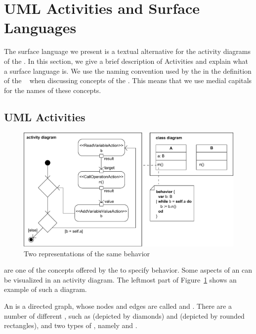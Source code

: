 \section{UML Activities and Surface Languages}
\label{sec:grammars-and-metamodels:Preliminaries}

The surface language we present is a textual alternative for the activity diagrams of the \UML.
In this section, we give a brief description of Activities and explain what a surface language is.
We use the naming convention used by the \OMG in the definition of the \UML~\cite{UMLsuper} when discussing concepts of the \UML.
This means that we use medial capitals for the names of these concepts.


\subsection{UML Activities}
\label{sub:grammars-and-metamodels:UML-Activities}

\begin{figure}
\centering
\includegraphics[scale=0.5]{grammars-and-metamodels/figs/diagram-comparison}
\caption{Two representations of the same behavior}
\label{fig:grammars-and-metamodels:UML-diagram-comparison}
\end{figure}

\Activities are one of the concepts offered by the \UML to specify behavior.
Some aspects of an \Activity can be visualized in an activity diagram.
The leftmost part of Figure~\ref{fig:grammars-and-metamodels:UML-diagram-comparison} shows an example of such a diagram.

An \Activity is a directed graph, whose nodes and edges are called \ActivityNodes and \ActivityEdges.
There are a number of different \ActivityNodes, such as \ControlNodes (depicted by diamonds) and \Actions (depicted by rounded rectangles), and two types of \ActivityEdges, namely \ControlFlows and \ObjectFlows.

